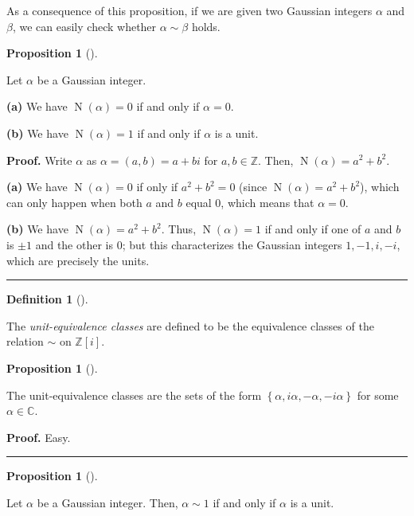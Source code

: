 \documentclass[numbers=enddot,12pt,final,onecolumn,notitlepage]{scrartcl}%
\numberwithin{exer}{subsection}
\theoremstyle{definition}
\newtheorem{prop}[theo]{Proposition}
\newenvironment{proposition}[1][]
{\begin{prop}[#1]\begin{leftbar}}
{\end{leftbar}\end{prop}}
\newtheorem{defi}[theo]{Definition}
\newenvironment{definition}[1][]
{\begin{defi}[#1]\begin{leftbar}}
{\end{leftbar}\end{defi}}
\newenvironment{proof}[1][Proof]{\noindent\textbf{#1.} }{\ \rule{0.5em}{0.5em}}
\begin{document}
As a consequence of this proposition, if we are given two Gaussian integers
$\alpha$ and $\beta$, we can easily check whether $\alpha\sim\beta$ holds.

\begin{proposition}
\label{prop.Z[i].gauss.norm1}Let $\alpha$ be a Gaussian integer.

\textbf{(a)} We have $\operatorname*{N}\left(  \alpha\right)  =0$ if and only
if $\alpha=0$.

\textbf{(b)} We have $\operatorname*{N}\left(  \alpha\right)  =1$ if and only
if $\alpha$ is a unit.
\end{proposition}

\begin{proof}
Write $\alpha$ as $\alpha=\left(  a,b\right)  =a+bi$ for $a,b\in\mathbb{Z}$.
Then, $\operatorname*{N}\left(  \alpha\right)  =a^{2}+b^{2}$.

\textbf{(a)} We have $\operatorname*{N}\left(  \alpha\right)  =0$ if only if
$a^{2}+b^{2}=0$ (since $\operatorname*{N}\left(  \alpha\right)  =a^{2}+b^{2}%
$), which can only happen when both $a$ and $b$ equal $0$, which means that
$\alpha=0$.

\textbf{(b)} We have $\operatorname*{N}\left(  \alpha\right)  =a^{2}+b^{2}$.
Thus, $\operatorname*{N}\left(  \alpha\right)  =1$ if and only if one of $a$
and $b$ is $\pm1$ and the other is $0$; but this characterizes the Gaussian
integers $1,-1,i,-i$, which are precisely the units.
\end{proof}

\begin{definition}
\label{def.Z[i].gauss.uniteq.cl}The \textit{unit-equivalence classes} are
defined to be the equivalence classes of the relation $\sim$ on $\mathbb{Z}%
\left[  i\right]  $.
\end{definition}

\begin{proposition}
\label{prop.Z[i].gauss.uniteq.cl}The unit-equivalence classes are the sets of
the form $\left\{  \alpha,i\alpha,-\alpha,-i\alpha\right\}  $ for some
$\alpha\in\mathbb{C}$.
\end{proposition}

\begin{proof}
Easy.
\end{proof}

\begin{proposition}
\label{prop.Z[i].gauss.uniteq.1}Let $\alpha$ be a Gaussian integer. Then,
$\alpha\sim1$ if and only if $\alpha$ is a unit.
\end{proposition}
\end{document}
